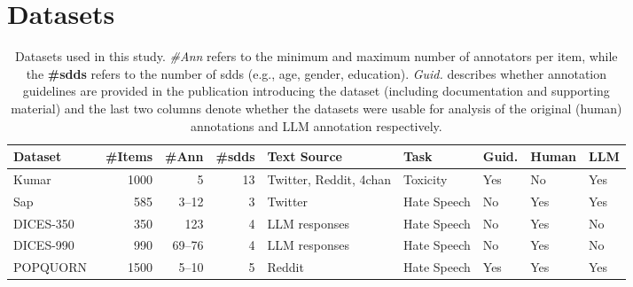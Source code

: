 \documentclass[manuscript,screen,review,anonymous]{acmart}
\theoremstyle{acmplain}
\theoremstyle{researchquestionstyle}
\begin{document}
\section{Datasets}
\label{sec:datasets}

\begin{table}[t]
	\caption{Datasets used in this study. \textit{\#Ann} refers to the minimum and maximum number of annotators per item, while the \textbf{\#\acp{sdd}} refers to the number of \acp{sdd} (e.g., age, gender, education). \textit{Guid.} describes whether annotation guidelines are provided in the publication introducing the dataset (including documentation and supporting material) and the last two columns denote whether the datasets were usable for analysis of the original (human) annotations and LLM annotation respectively.}
	\label{tab:datasets}
	\centering
	\begin{tabularx}{\linewidth}{lrrrXllll}
		\toprule
		\textbf{Dataset} & \textbf{\#Items} & \textbf{\#Ann} & \textbf{\#\acp{sdd}} & \textbf{Text Source} & \textbf{Task} & \textbf{Guid.} & \textbf{Human} & \textbf{LLM}\\
		\midrule
		Kumar~\citep{kumar-et-al-2021}
		& 1000 & 5   & 13 & Twitter, Reddit, 4chan & Toxicity & Yes & No & Yes\\
		
		Sap~\citep{sap-etal-2022-annotators}
		& 585       & 3--12   & 3  & Twitter & Hate Speech& No& Yes & Yes  \\
		
		DICES-350~\citep{dices}
		& 350   & 123    & 4  & LLM responses & Hate Speech & No & Yes& No  \\
		
		DICES-990~\citep{dices}
		& 990  & 69--76 & 4 &  LLM responses & Hate Speech& No & Yes& No \\
		
		POPQUORN~\citep{pei-jurgens-2023-annotator}
		& 1500 &5--10 & 5 & Reddit & Hate Speech & Yes & Yes & Yes \\
		\bottomrule
	\end{tabularx}
\end{table}
\end{document}
